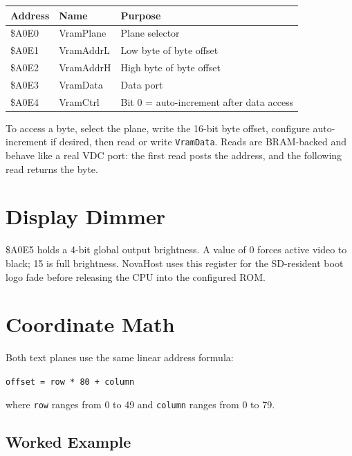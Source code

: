 
\begin{center}
\small
\begin{tabular}{@{}lll@{}}
\toprule
\textbf{Address} & \textbf{Name} & \textbf{Purpose} \\
\midrule
\$A0E0 & VramPlane & Plane selector \\
\$A0E1 & VramAddrL & Low byte of byte offset \\
\$A0E2 & VramAddrH & High byte of byte offset \\
\$A0E3 & VramData & Data port \\
\$A0E4 & VramCtrl & Bit 0 = auto-increment after data access \\
\bottomrule
\end{tabular}
\end{center}

To access a byte, select the plane, write the 16-bit byte offset, configure
auto-increment if desired, then read or write \texttt{VramData}. Reads are
BRAM-backed and behave like a real VDC port: the first read posts the address,
and the following read returns the byte.

\section{Display Dimmer}


\$A0E5 holds a 4-bit global output brightness. A value of 0 forces active
video to black; 15 is full brightness. NovaHost uses this register for the
SD-resident boot logo fade before releasing the CPU into the configured ROM.

\section{Coordinate Math}
\label{sec:screen-math}

Both text planes use the same linear address formula:

\begin{center}
\texttt{offset = row * 80 + column}
\end{center}

\noindent where \texttt{row} ranges from 0 to 49 and \texttt{column} ranges
from 0 to 79.

\subsection{Worked Example}

